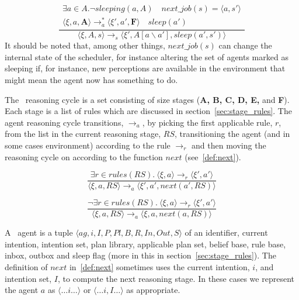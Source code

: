 \begin{equation}
  \frac{
    \begin{array}{c}
    \exists a \in A. \neg sleeping(a, A) \quad
    next\_job(s) = \langle a, s' \rangle \\
    \langle \xi, a, \textbf{A} \rangle \rightarrow_{a}^* \langle \xi', a', \textbf{F} \rangle
    \quad  sleep(a')
\end{array}
    }{
\langle \xi, A, s \rangle \rightarrow_s \langle \xi', A[a \backslash a'], sleep(a', s') \rangle}
\end{equation}
It should be noted that, among other things, $next\_job(s)$ can change the internal state of the scheduler, for instance altering the set of agents marked as sleeping if, for instance, new perceptions are available in the environment that might mean  the agent now has something to do.

The \gwendolen\ reasoning cycle is a set consisting of size stages (\textbf{A, B, C, D, E,} and \textbf{F}).  Each stage is a list of rules which are discussed in section~\ref{sec:stage_rules}.  The agent reasoning cycle transitions, $\rightarrow_a$, by picking the first applicable rule, $r$, from the list in the current reasoning stage, $RS$, transitioning the agent (and in some cases environment) according to the rule $\rightarrow_r$ and then moving the reasoning cycle on according to the function $next$ (see~\eqref{def:next}).  

\begin{equation}
\frac{\exists r \in rules(RS). \: \langle \xi, a \rangle \rightarrow_r \langle \xi', a' \rangle}
{\langle \xi, a, RS \rangle \rightarrow_a \langle \xi', a', next(a', RS) \rangle}
\end{equation}

\begin{equation}
\frac{\neg \exists r \in rules(RS). \: \langle \xi, a \rangle \rightarrow_r \langle \xi', a' \rangle}
{\langle \xi, a, RS \rangle \rightarrow_a \langle \xi, a, next(a, RS) \rangle}
\end{equation}

A \gwendolen\ agent is a tuple $\langle \mathit{ag}, i, I, P, \mathit{Pl}, B, \mathit{R}, \mathit{In}, \mathit{Out}, S \rangle$ of an identifier, current intention, intention set, plan library, applicable plan set, belief base, rule base, inbox, outbox and sleep flag (more in this in section~\ref{sec:stage_rules}). 
The definition of $next$ in~\eqref{def:next} sometimes uses the current intention, $i$, and intention set, $I$, to compute the next reasoning stage.  In these cases we represent the agent $a$ as $\langle \ldots i \ldots \rangle$ or $\langle \ldots i, I \ldots \rangle$ as appropriate.

